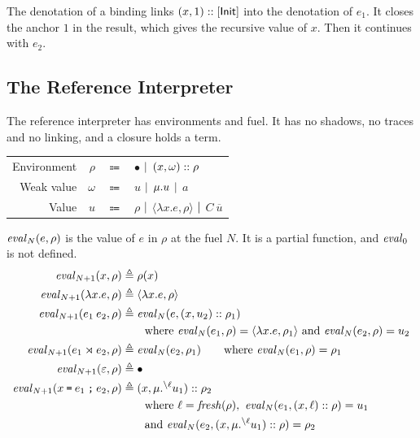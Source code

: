 The denotation of a binding links $(x,1)\cons[\InitE]$ into the denotation of $e_1$.
It closes the anchor $1$ in the result, which gives the recursive value of $x$.
Then it continues with $e_2$.

\subsection{The Reference Interpreter}

The reference interpreter has environments and fuel.
It has no shadows, no traces and no linking, and a closure holds a term.
\begin{center}
  \small
  \begin{tabular}{rrcl}
    Environment & $\rho$   & $\Coloneqq$ & $\bullet$ $|$ $(x,\omega)::\rho$                                  \\
    Weak value  & $\omega$ & $\Coloneqq$ & $u$ $|$ $\mu.{u}$ $|$ $a$                                     \\
    Value       & $u$      & $\Coloneqq$ & $\rho$ $|$ $\langle\lambda x.e,\rho\rangle$ $|$ $C\:\overline{u}$
  \end{tabular}
\end{center}
$\mathit{eval}_{N}(e,\rho)$ is the value of $e$ in $\rho$ at the fuel $N$.
It is a partial function, and $\mathit{eval}_{0}$ is not defined.
\begin{alignat*}{2}
  \evalf{N+1}(x,\rho)                    & \triangleq\rho(x)                                                                                                   \\
  \evalf{N+1}(\lambda x.e,\rho)          & \triangleq\langle\lambda x.e,\rho\rangle                                                                            \\
  \evalf{N+1}(e_1\:e_2,\rho)             & \triangleq\evalf{N}(e,(x,u_2)\cons\rho_1)                                                                            \\
                                         & \qquad\text{where }\evalf{N}(e_1,\rho)=\langle\lambda x.e,\rho_1\rangle\text{ and }\evalf{N}(e_2,\rho)=u_2            \\
  \evalf{N+1}(e_1\synlink e_2,\rho)      & \triangleq\evalf{N}(e_2,\rho_1)\qquad\text{where }\evalf{N}(e_1,\rho)=\rho_1                                         \\
  \evalf{N+1}(\varepsilon,\rho)          & \triangleq\bullet                                                                                                   \\
  \evalf{N+1}(\synbind{x}{e_1}{e_2},\rho) & \triangleq(x,\muval{\closeloc{\ell}{u_1}})\cons\rho_2                                                               \\
                                         & \qquad\text{where }\ell=\fresh(\rho),\ \evalf{N}(e_1,(x,\ell)\cons\rho)=u_1                                           \\
                                         & \qquad\text{and }\evalf{N}(e_2,(x,\muval{\closeloc{\ell}{u_1}})\cons\rho)=\rho_2
\end{alignat*}
